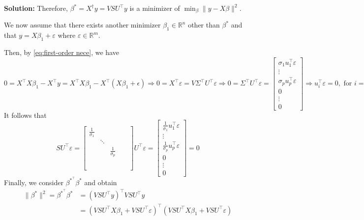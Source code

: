 \documentclass[11pt]{article}
\theoremstyle{plain} %
\newenvironment{solution}
{\color{C2}\normalfont\begin{framed}\begingroup\textbf{Solution:} }
  {\endgroup\end{framed}}
\theoremstyle{remark}
\begin{document}
\begin{solution}
    Therefore, $\beta^* = X^\dagger y = V S U^\top y$ is a minimizer of $\min_{\beta}\|y-X \beta\|^2$.

    We now assume that there exists another minimizer $\beta_1 \in \mathbb{R}^n$ other than $\beta^*$ and that $y = X\beta_1 + \varepsilon$ where $\varepsilon\in \mathbb{R}^m$.

    Then, by \cref{eq:first-order nece}, we have 
    $$
    0 = X^\top X \beta_1 - X^\top y = X^\top X \beta_1 - X^\top (X\beta_1+\epsilon) \Longrightarrow 0 = X^\top \varepsilon = V\Sigma^\top U^\top \varepsilon \Longrightarrow 0 = \Sigma^\top U^\top \varepsilon  = \begin{bmatrix}
        \sigma_1 u_1^\top \varepsilon \\
        \vdots\\
         \sigma_p u_p^\top \varepsilon\\
         0\\
         \vdots\\
         0
    \end{bmatrix} \Longrightarrow u_i^\top \varepsilon = 0, \text{ for } i=1, \ldots, p
    $$
    It follows that
    $$
    SU^\top \varepsilon = \begin{bmatrix}
        \frac{1}{\sigma_1} & & & &\\
        & \ddots &  &  &\\
         & & \frac{1}{\sigma_p} & &\\
         & &  & &\\
         &  &  &  &\\
         &  &  &  &\\
    \end{bmatrix} U^\top \varepsilon = \begin{bmatrix}
        \frac{1}{\sigma_1} u_1^\top \varepsilon \\
        \vdots\\
         \frac{1}{\sigma_p} u_p^\top \varepsilon\\
         0\\
         \vdots\\
         0
    \end{bmatrix} = 0
    $$
    Finally, we consider $\beta^{*^\top}\beta^*$ and obtain
    \begin{align*}
        \|\beta^* \|^2=\beta^{*^\top}\beta^* 
        &= (V S U^\top y)^\top V S U^\top y\\
        &= (V S U^\top X\beta_1 + V S U^\top\varepsilon)^\top  (V S U^\top X\beta_1 + V S U^\top\varepsilon)\\

\end{align*}
\end{solution}
\end{document}
